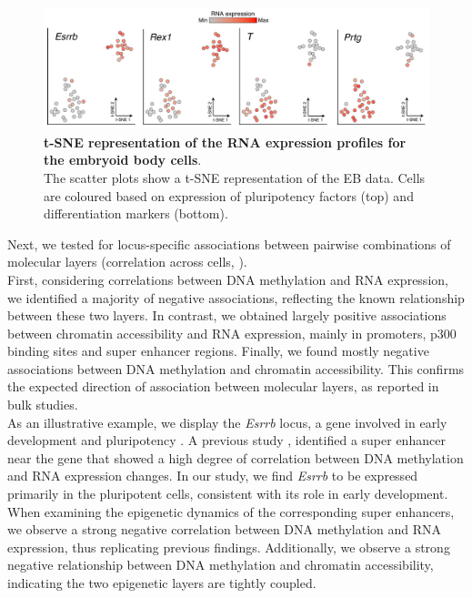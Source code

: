 \begin{figure}[H]
	\centering
	\includegraphics[width=1.00\linewidth]{scNMT_EB_RNA}
	\caption[]{\textbf{t-SNE representation of the RNA expression profiles for the embryoid body cells}.\\
	The scatter plots show a t-SNE \cite{vanDerMaaten2008} representation of the EB data. Cells are coloured based on expression of pluripotency factors (top) and differentiation markers (bottom). }
	\label{fig:scnmt_eb_rna}
\end{figure}

Next, we tested for locus-specific associations between pairwise combinations of molecular layers (correlation across cells, ).\\
First, considering correlations between DNA methylation and RNA expression, we identified a majority of negative associations, reflecting the known relationship between these two layers. In contrast, we obtained largely positive associations between chromatin accessibility and RNA expression, mainly in promoters, p300 binding sites and super enhancer regions. Finally, we found mostly negative associations between DNA methylation and chromatin accessibility. This confirms the expected direction of association between molecular layers, as reported in bulk studies.\\
As an illustrative example, we display the \textit{Esrrb} locus, a gene involved in early development and pluripotency \cite{Papp2012}. A previous study \cite{Angermueller2016}, identified a super enhancer near the gene that showed a high degree of correlation between DNA methylation and RNA expression changes. In our study, we find \textit{Esrrb} to be expressed primarily in the pluripotent cells, consistent with its role in early development. When examining the epigenetic dynamics of the corresponding super enhancers, we observe a strong negative correlation between DNA methylation and RNA expression, thus replicating previous findings. Additionally, we observe a strong negative relationship between DNA methylation and chromatin accessibility, indicating the two epigenetic layers are tightly coupled.

